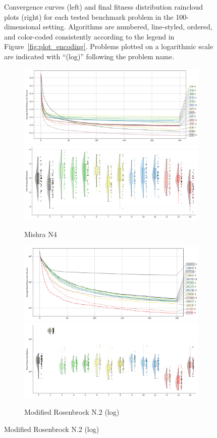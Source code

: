\begin{figure}[p]
\captionsetup{list=no}
\caption[Convergence curves and final fitness distribution raincloud plots for 100-dimensional problems]{Convergence curves (left) and final fitness distribution raincloud plots (right) for each tested benchmark problem in the 100-dimensional setting. Algorithms are numbered, line-styled, ordered, and color-coded consistently according to the legend in Figure~\ref{fig:plot_encoding}. Problems plotted on a logarithmic scale are indicated with ``(log)'' following the problem name.}
\end{figure}







\begin{figure}[p]\ContinuedFloat
\renewcommand\thesubfigure{C.\arabic{figure}.\arabic{subfigure}} %

    \centering

\begin{subfigure}{1\textwidth}
    \centering
    \includegraphics[width=.49\textwidth]{Figures/results/100/Mishra_N4_All_selected_algorithms_dim100_annot_legend.png}
    \includegraphics[width=.49\textwidth]{Figures/results/100/Mishra_N4_all_dim100_raincloud_vertical.png}
    \caption{Mishra N4}
\end{subfigure}

\begin{subfigure}{1\textwidth}
    \centering
    \includegraphics[width=.49\textwidth]{Figures/results/100/Modified_Rosenbrock_No.02___Hollow_Ground_Bent_Knife_Edge_All_selected_algorithms_dim100_annot_legend.png}
    \includegraphics[width=.49\textwidth]{Figures/results/100/Modified_Rosenbrock_No.02___Hollow_Ground_Bent_Knife_Edge_all_dim100_raincloud_vertical.png}
    \caption{Modified Rosenbrock N.2 (log)}
\end{subfigure}


\end{figure}
